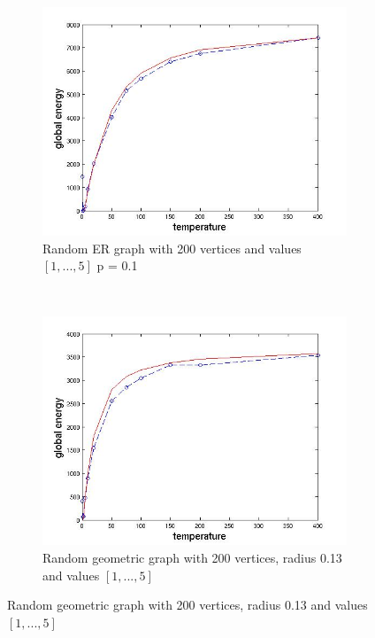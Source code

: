\documentclass[12pt]{report}
\begin{document}
\begin{figure}[t]
    \centering
    \begin{subfigure}[b]{0.4\textwidth}
        \includegraphics[width=\textwidth]{er200x01}
        \caption{ Random ER graph with 200 vertices and values $[1, ..., 5]$ p = 0.1}

    \end{subfigure}
	~
    \begin{subfigure}[b]{0.4\textwidth}
        \includegraphics[width=\textwidth]{rgg200x013}
        \caption{ Random geometric graph with 200 vertices, radius 0.13 and values $[1, ..., 5]$ }

    \end{subfigure}


\end{figure}
\end{document}
